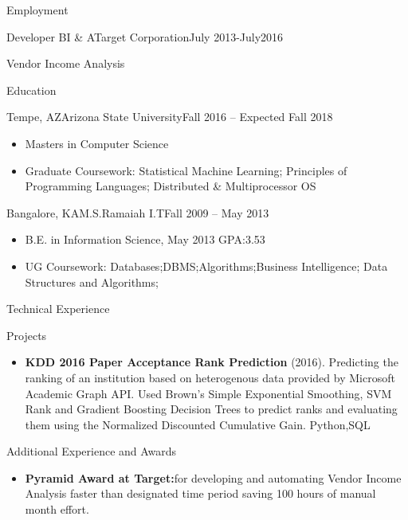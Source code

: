 \documentclass[]{mcdowellcv}
\begin{document}
\begin{cvsection}{Employment}
\begin{cvsubsection}{Developer BI \& A}{Target Corporation}{July 2013-July2016}
\begin{cvsubsection}{Vendor Income Analysis}{}{}
\begin{itemize}
				\end{itemize}
			\end{cvsubsection}
		\end{cvsubsection}
	\begin{cvsection}{Education}
		\begin{cvsubsection}{Tempe, AZ}{Arizona State University}{Fall 2016 -- Expected Fall 2018}
			\begin{itemize}
				\item Masters in Computer Science
				\item Graduate Coursework: Statistical Machine Learning; Principles of Programming Languages; Distributed \& Multiprocessor OS
			\end{itemize}
		\end{cvsubsection}
		\begin{cvsubsection}{Bangalore, KA}{M.S.Ramaiah I.T}{Fall 2009 -- May 2013}
			\begin{itemize}
				\item B.E. in Information Science, May 2013 GPA:3.53
				\item UG Coursework: Databases;DBMS;Algorithms;Business Intelligence; Data Structures and Algorithms;
			\end{itemize}
		\end{cvsubsection}
	\end{cvsection}
	\begin{cvsection}{Technical Experience}
		\begin{cvsubsection}{Projects}{}{}
			\begin{itemize}
				\item \textbf{KDD 2016 Paper Acceptance Rank Prediction} (2016). Predicting the ranking of an institution based on heterogenous data provided by Microsoft Academic Graph API. Used Brown's Simple Exponential Smoothing, SVM Rank and Gradient Boosting Decision Trees to predict ranks and evaluating them using the Normalized Discounted Cumulative Gain. Python,SQL 
			\end{itemize}
		\end{cvsubsection}
	\end{cvsection}
	\begin{cvsection}{Additional Experience and Awards}
		\begin{cvsubsection}{}{}{}	
			\begin{itemize}
				\item \textbf{Pyramid Award at Target:}for developing and automating Vendor Income Analysis faster than designated time period saving 100 hours of manual month effort.

\end{itemize}
\end{cvsubsection}
\end{cvsection}
\end{cvsection}
\end{document}
